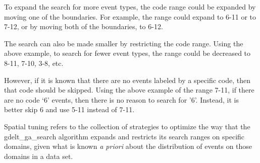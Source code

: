 \par To expand the search for more event types, the code range could be expanded by moving one of the boundaries. For example, the range could expand to 6-11 or  to 7-12, or by moving both of the boundaries, to 6-12.

\par The search can also be made smaller by restricting the code range. 
Using the above example, to search for fewer event types, the range could be decreased to 8-11, 7-10, 3-8, etc.

\par However, if it is known that there are no events labeled by a specific code, then that code should be skipped. 
Using the above example of the range 7-11, if there are no code `6' events, then there is no reason to search for '6'. Instead, it is better skip 6 and use 5-11 instead of 7-11.

\par Spatial tuning refers to the collection of strategies to optimize the way that the gdelt\_ga\_search algorithm expands and restricts its search ranges on specific domains, given what is known \textit{a priori} about the distribution of events on those domains in a data set.

